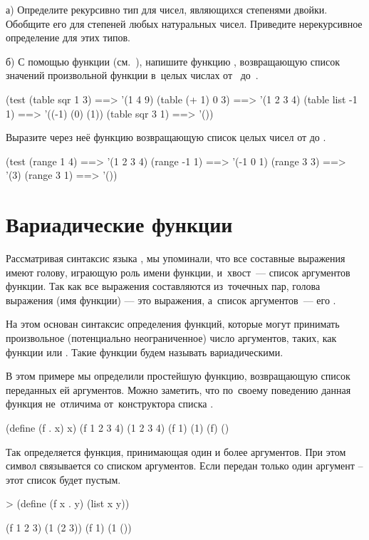\newpage
\begin{Assignment}
а) Определите рекурсивно тип для чисел, являющихся степенями двойки. Обобщите его для степеней любых натуральных чисел. Приведите нерекурсивное определение для этих типов.
\medskip

б) С помощью функции  (см.~), напишите функцию , возвращающую список значений произвольной функции  в~целых числах от~ до~.

\begin{Specification}
(test 
  (table sqr 1 3)    ==> '(1 4 9)
  (table (+ 1) 0 3)  ==> '(1 2 3 4)
  (table list -1 1)  ==> '((-1) (0) (1))
  (table sqr 3 1)    ==> '())
\end{Specification}

Выразите через неё функцию  возвращающую список целых чисел от  до .
\begin{Specification}
(test 
  (range 1 4)   ==> '(1 2 3 4)
  (range -1 1)  ==> '(-1 0 1)
  (range 3 3)   ==> '(3)
  (range 3 1)   ==> '())
\end{Specification}
\end{Assignment}

\section{Вариадические функции}%
Рассматривая синтаксис языка \Scheme, мы упоминали, что все составные выражения имеют голову, играющую роль имени функции, и~хвост~--- список аргументов функции. Так как все выражения \Scheme составляются из~точечных пар, голова выражения (имя функции) --- это  выражения, а~список аргументов~--- его .

На этом основан синтаксис определения функций, которые могут принимать произвольное (потенциально неограниченное) число аргументов, таких, как функции \s{+} или \s{-}. Такие функции будем называть вариадическими.

\begin{example}{%
В этом примере мы определили простейшую функцию, возвращающую список переданных ей аргументов. Можно заметить, что по~своему поведению данная функция не~отличима от~конструктора списка .}

\REPLin
  {(define (f . x) x)}
\REPL
  {(f 1 2 3 4)}
  {(1 2 3 4)}
\REPL
  {(f 1)}
  {(1)}
\REPL
  {(f)}
  {()}
\end{example}
\vspace{-\bigskipamount}
\begin{example}{%
Так определяется функция, принимающая один и более аргументов. При этом символ  связывается со списком аргументов. Если передан только один аргумент -- этот список будет пустым.}

\begin{ExampleCode}[emph={x,y}]
> (define (f x . y)
    (list x y))
\end{ExampleCode}
\REPL
  {(f 1 2 3)}
  {(1 (2 3))}
\REPL
  {(f 1)}
  {(1 ())}
\end{example}

